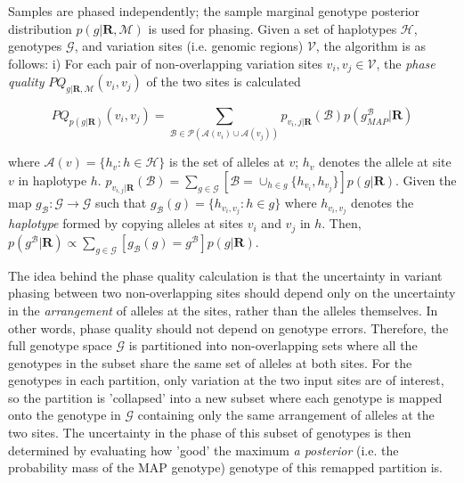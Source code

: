 \documentclass[notitlepage, twocolumn, 10pt]{article}
\begin{document}
Samples are phased independently; the sample marginal genotype posterior distribution $p(g | \boldsymbol{R}, \mathcal{M})$ is used for phasing. Given a set of haplotypes $\mathcal{H}$, genotypes $\mathcal{G}$, and variation sites (i.e. genomic regions) $\mathcal{V}$, the algorithm is as follows:  i) For each pair of non-overlapping variation sites $v_i,v_j \in \mathcal{V}$, the \emph{phase quality} $PQ_{g | \boldsymbol{R}, \mathcal{M}}(v_i,v_j)$ of the two sites is calculated

\begin{equation*}
PQ_{p(g | \boldsymbol{R})}(v_i,v_j) =
	\sum_{\mathcal{B} \in \mathcal{P}(\mathcal{A}(v_i) \cup \mathcal{A}(v_j))} p_{v_i,j | \boldsymbol{R}}(\mathcal{B}) p(g^{\mathcal{B}}_{MAP} | \boldsymbol{R})
\end{equation*}

\noindent where $\mathcal{A}(v) = \{ h_v : h \in \mathcal{H} \}$ is the set of alleles at $v$; $h_v$ denotes the allele at site $v$ in haplotype $h$. $p_{v_{i,j} | \boldsymbol{R}}(\mathcal{B}) = \sum_{g \in \mathcal{G}} [\mathcal{B} = \cup_{h \in g} \{ h_{v_i}, h_{v_j} \}] p(g | \boldsymbol{R})$. Given the map $g_{\mathcal{B}} : \mathcal{G} \rightarrow \mathcal{G}$ such that $g_{\mathcal{B}}(g) = \{h_{v_i, v_j} : h \in g \}$ where $h_{v_i, v_j}$ denotes the \emph{haplotype} formed by copying alleles at sites $v_i$ and $v_j$ in $h$. Then,  $p(g^{\mathcal{B}} | \boldsymbol{R}) \propto \sum_{g \in \mathcal{G}} [g_{\mathcal{B}}(g) = g^{\mathcal{B}}] p(g | \boldsymbol{R})$.

The idea behind the phase quality calculation is that the uncertainty in variant phasing between two non-overlapping sites should depend only on the uncertainty in the \emph{arrangement} of alleles at the sites, rather than the alleles themselves. In other words, phase quality should not depend on genotype errors. Therefore, the full genotype space $\mathcal{G}$ is partitioned into non-overlapping sets where all the genotypes in the subset share the same set of alleles at both sites. For the genotypes in each partition, only variation at the two input sites are of interest, so the partition is 'collapsed' into a new subset where each genotype is mapped onto the genotype in $\mathcal{G}$ containing only the same arrangement of alleles at the two sites. The uncertainty in the phase of this subset of genotypes is then determined by evaluating how 'good' the maximum \textit{a posterior} (i.e. the probability mass of the MAP genotype) genotype of this remapped partition is.
\end{document}
